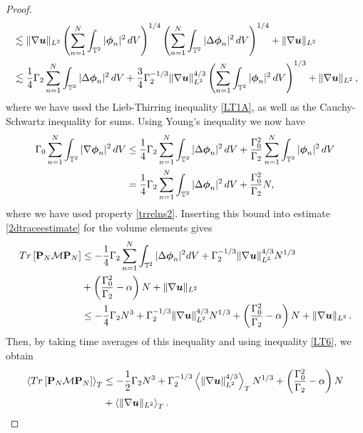 \documentclass[11pt]{amsart}
\newcommand{\bphi}{\mbox{\boldmath$\phi$}}
\newcommand{\bu}{\mbox{\boldmath$u$}}
\newcommand{\Gamzero}{\Gamma_{0}}
\newcommand{\Gamtwo}{\Gamma_{2}}
\theoremstyle{definition}
\numberwithin{equation}{section}
\numberwithin{equation}{section}
\begin{document}
\begin{proof}
\begin{align*}
&\lesssim \lVert \nabla \bu \rVert_{L^2} \left(\sum_{n=1}^{N} \int_{\mathbb{T}^2} |\bphi_{n}|^{2}\,dV \right)^{1/4} \left( \sum_{n=1}^{N} \int_{\mathbb{T}^2} |\Delta\bphi_{n}|^{2}\,dV \right)^{1/4} + \lVert \nabla \bu \rVert_{L^2} \\
&\lesssim \frac{1}{4} \Gamtwo \sum_{n=1}^{N} \int_{\mathbb{T}^2} |\Delta\bphi_{n}|^{2}\,dV + \frac{3}{4}\Gamtwo^{-1/3} \lVert \nabla \bu \rVert_{L^2}^{4/3} \left(\sum_{n=1}^{N} \int_{\mathbb{T}^2} |\bphi_{n}|^{2}\,dV \right)^{1/3} + \lVert \nabla \bu \rVert_{L^2}\,,
\end{align*}
where we have used the Lieb-Thirring inequality \eqref{LT1A}, as well as the Cauchy-Schwartz inequality for sums. Using Young's inequality we now have
\begin{align*}
\Gamzero \sum_{n=1}^{N} \int_{\mathbb{T}^2} |\nabla\bphi_{n}|^{2}\,dV &\leq \frac{1}{4} \Gamtwo \sum_{n=1}^{N} \int_{\mathbb{T}^2} |\Delta\bphi_{n}|^{2}\,dV + \frac{\Gamzero^2}{\Gamtwo} \sum_{n=1}^{N} \int_{\mathbb{T}^2} |\bphi_{n}|^{2}\,dV \\
&= \frac{1}{4} \Gamtwo \sum_{n=1}^{N} \int_{\mathbb{T}^2} |\Delta\bphi_{n}|^{2}\,dV + \frac{\Gamzero^2}{\Gamtwo} N,
\end{align*}
where we have used property \eqref{trrelns2}. Inserting this bound into estimate \eqref{2dtraceestimate} for the volume elements gives
\begin{align*}
Tr \left[ \mathbf{P}_{N}\mathcal{M}\mathbf{P}_{N}\right] &\leq - \frac{1}{4} \Gamtwo \sum_{n=1}^{N} \int_{\mathbb{T}^2}|\Delta\bphi_{n}|^{2}dV + \Gamtwo^{-1/3} \lVert \nabla \bu \rVert_{L^2}^{4/3} N^{1/3}\\ 
&+ \left( \frac{\Gamzero^2}{\Gamtwo} - \alpha \right) N + \lVert \nabla \bu \rVert_{L^2} \\
&\leq - \frac{1}{4}\Gamtwo N^3 + \Gamtwo^{-1/3}\lVert \nabla \bu \rVert_{L^2}^{4/3} N^{1/3} + \left( \frac{\Gamzero^2}{\Gamtwo} - \alpha \right) N + \lVert \nabla \bu \rVert_{L^2} \,.
\end{align*}
Then, by taking time averages of this inequality and using inequality \eqref{LT6}, we obtain
\begin{align*}
\left<Tr \left[ \mathbf{P}_{N}\mathcal{M}\mathbf{P}_{N}\right] \right>_{T} &\leq - \frac{1}{2}\Gamtwo N^3 + \Gamtwo^{-1/3} \left\langle \lVert \nabla \bu \rVert_{L^2}^{4/3} \right\rangle_T N^{1/3} + \left( \frac{\Gamzero^2}{\Gamtwo} - \alpha \right) N \\
&+ \left\langle \lVert \nabla \bu \rVert_{L^2} \right\rangle_{T}.
\end{align*}

\end{proof}
\end{document}
